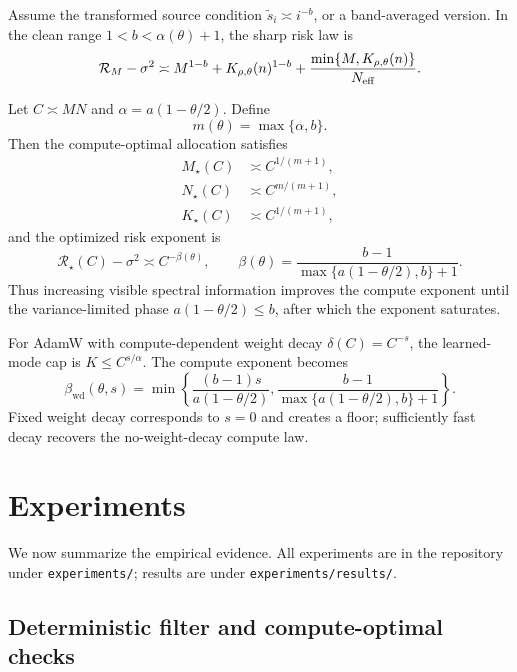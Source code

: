 \documentclass[11pt]{article}
\newcommand{\wd}{\mathrm{wd}}
\newcommand{\risk}{\mathcal R}
\begin{document}
Assume the transformed source condition $\tilde s_i\asymp i^{-b}$, or a band-averaged version.  In the clean range $1<b<\alpha(\theta)+1$, the sharp risk law is
\begin{equation}
\label{eq:visible-risk}
    \risk_M-\sigma^2
    \asymp
    M^{1-b}+K_{\rho,\theta}(n)^{1-b}
    +\frac{\min\{M,K_{\rho,\theta}(n)\}}{N_{\rm eff}}.
\end{equation}

Let $C\asymp MN$ and $\alpha=a(1-\theta/2)$.  Define
\begin{equation}
    m(\theta)=\max\{\alpha,b\}.
\end{equation}
Then the compute-optimal allocation satisfies
\begin{align}
    M_\star(C)&\asymp C^{1/(m+1)},\\
    N_\star(C)&\asymp C^{m/(m+1)},\\
    K_\star(C)&\asymp C^{1/(m+1)},
\end{align}
and the optimized risk exponent is
\begin{equation}
\label{eq:compute-exponent}
    \risk_\star(C)-\sigma^2
    \asymp
    C^{-\beta(\theta)},\qquad
    \beta(\theta)=\frac{b-1}{\max\{a(1-\theta/2),b\}+1}.
\end{equation}
Thus increasing visible spectral information improves the compute exponent until the variance-limited phase $a(1-\theta/2)\le b$, after which the exponent saturates.

For AdamW with compute-dependent weight decay $\delta(C)=C^{-s}$, the learned-mode cap is $K\le C^{s/\alpha}$.  The compute exponent becomes
\begin{equation}
\label{eq:wd-exponent}
    \beta_{\wd}(\theta,s)
    =
    \min\left\{
        \frac{(b-1)s}{a(1-\theta/2)},
        \frac{b-1}{\max\{a(1-\theta/2),b\}+1}
    \right\}.
\end{equation}
Fixed weight decay corresponds to $s=0$ and creates a floor; sufficiently fast decay recovers the no-weight-decay compute law.

\section{Experiments}

We now summarize the empirical evidence.  All experiments are in the repository under \texttt{experiments/}; results are under \texttt{experiments/results/}.

\subsection{Deterministic filter and compute-optimal checks}
\end{document}
